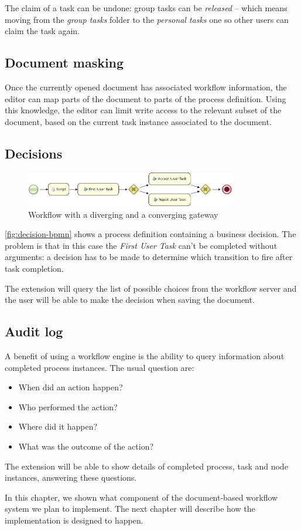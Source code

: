 The claim of a task can be undone: group tasks can be \emph{released} -- which
means moving from the \emph{group tasks} folder to the \emph{personal tasks}
one so other users can claim the task again.

\subsection*{Document masking}

Once the currently opened document has associated workflow information, the
editor can map parts of the document to parts of the process definition. Using
this knowledge, the editor can limit write access to the relevant subset of the
document, based on the current task instance associated to the document.

\subsection*{Decisions}

\begin{figure}[H]
\centering
\includegraphics[width=350px,keepaspectratio]{decision-bpmn.png}
\caption{Workflow with a diverging and a converging gateway}
\label{fig:decision-bpmn}
\end{figure}

\autoref{fig:decision-bpmn} shows a process definition containing a business
decision. The problem is that in this case the \emph{First User Task} can't be
completed without arguments: a decision has to be made to determine which
transition to fire after task completion.

The extension will query the list of possible choices from the workflow server
and the user will be able to make the decision when saving the document.

\subsection*{Audit log}

A benefit of using a workflow engine is the ability to query information about
completed process instances. The usual question are:

\begin{itemize}
\item When did an action happen?
\item Who performed the action?
\item Where did it happen?
\item What was the outcome of the action?
\end{itemize}

The extension will be able to show details of completed process, task and node
instances, answering these questions.

In this chapter, we shown what component of the document-based workflow system we
plan to implement. The next chapter will describe how the implementation is
designed to happen.
